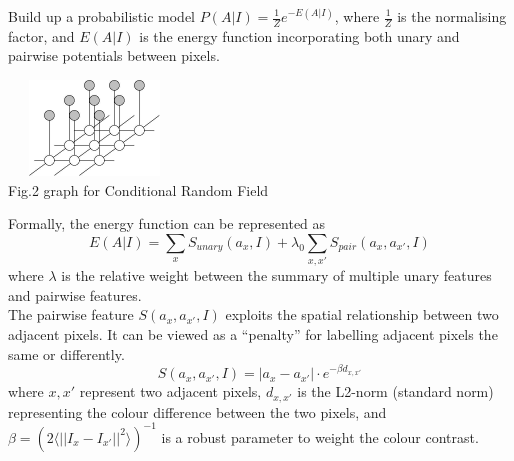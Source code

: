 \documentclass[10pt,twocolumn,letterpaper]{article}
\newcommand{\SUM}{\sum\limits}
\begin{document}
    Build up a probabilistic model $P(A|I)=\frac{1}{Z}e^{-E(A|I)}$, where $\frac{1}{Z}$ is the normalising factor, and $E(A|I)$ is the energy function incorporating both unary and pairwise potentials between pixels.
    \begin{center}
        \includegraphics[width=1.8in,height=1in]{./Figures/mrf.jpg} \\
        \footnotesize Fig.2 graph for Conditional Random Field
        \end{center}



    Formally, the energy function can be represented as
    $$
    E(A|I) = \SUM_x S_{unary}(a_x,I) + \lambda_0 \SUM_{x,x'}S_{pair}(a_x,a_{x'},I)
    $$
    where $\lambda$ is the relative weight between the summary of multiple unary features and pairwise features. \\[10pt]
    The pairwise feature $S(a_x,a_{x'},I)$ exploits the spatial relationship between two adjacent pixels.  It can be viewed as a ``penalty'' for labelling adjacent pixels the same or differently.
    $$
    S(a_x,a_{x'},I) = |a_x-a_{x'}| \cdot e^{-\beta d_{x,x'}}
    $$
    where $x,x'$ represent two adjacent pixels, $d_{x,x'}$ is the L2-norm (standard norm) representing the colour difference between the two pixels, and $\beta=(2\langle||I_x-I_{x'}||^2\rangle)^{-1}$ is a robust parameter to weight the colour contrast.
    
\end{document}

